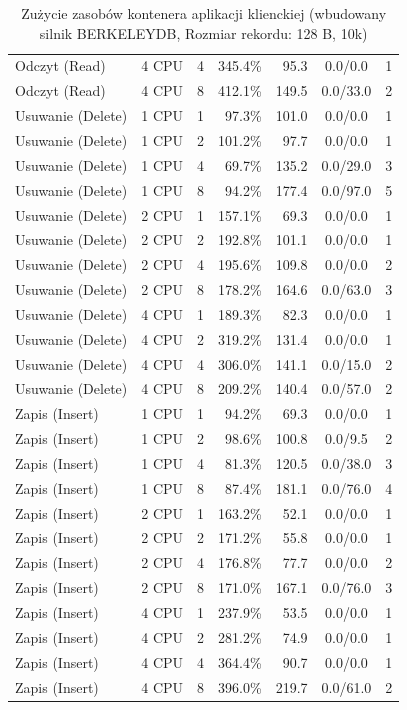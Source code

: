 \begin{table}[ht]
{\begin{tabular}{llcrrcc}
Odczyt (Read) & 4 CPU & 4 & 345.4\% & 95.3 & 0.0/0.0 & 1 \\
Odczyt (Read) & 4 CPU & 8 & 412.1\% & 149.5 & 0.0/33.0 & 2 \\
Usuwanie (Delete) & 1 CPU & 1 & 97.3\% & 101.0 & 0.0/0.0 & 1 \\
Usuwanie (Delete) & 1 CPU & 2 & 101.2\% & 97.7 & 0.0/0.0 & 1 \\
Usuwanie (Delete) & 1 CPU & 4 & 69.7\% & 135.2 & 0.0/29.0 & 3 \\
Usuwanie (Delete) & 1 CPU & 8 & 94.2\% & 177.4 & 0.0/97.0 & 5 \\
Usuwanie (Delete) & 2 CPU & 1 & 157.1\% & 69.3 & 0.0/0.0 & 1 \\
Usuwanie (Delete) & 2 CPU & 2 & 192.8\% & 101.1 & 0.0/0.0 & 1 \\
Usuwanie (Delete) & 2 CPU & 4 & 195.6\% & 109.8 & 0.0/0.0 & 2 \\
Usuwanie (Delete) & 2 CPU & 8 & 178.2\% & 164.6 & 0.0/63.0 & 3 \\
Usuwanie (Delete) & 4 CPU & 1 & 189.3\% & 82.3 & 0.0/0.0 & 1 \\
Usuwanie (Delete) & 4 CPU & 2 & 319.2\% & 131.4 & 0.0/0.0 & 1 \\
Usuwanie (Delete) & 4 CPU & 4 & 306.0\% & 141.1 & 0.0/15.0 & 2 \\
Usuwanie (Delete) & 4 CPU & 8 & 209.2\% & 140.4 & 0.0/57.0 & 2 \\
Zapis (Insert) & 1 CPU & 1 & 94.2\% & 69.3 & 0.0/0.0 & 1 \\
Zapis (Insert) & 1 CPU & 2 & 98.6\% & 100.8 & 0.0/9.5 & 2 \\
Zapis (Insert) & 1 CPU & 4 & 81.3\% & 120.5 & 0.0/38.0 & 3 \\
Zapis (Insert) & 1 CPU & 8 & 87.4\% & 181.1 & 0.0/76.0 & 4 \\
Zapis (Insert) & 2 CPU & 1 & 163.2\% & 52.1 & 0.0/0.0 & 1 \\
Zapis (Insert) & 2 CPU & 2 & 171.2\% & 55.8 & 0.0/0.0 & 1 \\
Zapis (Insert) & 2 CPU & 4 & 176.8\% & 77.7 & 0.0/0.0 & 2 \\
Zapis (Insert) & 2 CPU & 8 & 171.0\% & 167.1 & 0.0/76.0 & 3 \\
Zapis (Insert) & 4 CPU & 1 & 237.9\% & 53.5 & 0.0/0.0 & 1 \\
Zapis (Insert) & 4 CPU & 2 & 281.2\% & 74.9 & 0.0/0.0 & 1 \\
Zapis (Insert) & 4 CPU & 4 & 364.4\% & 90.7 & 0.0/0.0 & 1 \\
Zapis (Insert) & 4 CPU & 8 & 396.0\% & 219.7 & 0.0/61.0 & 2 \\
\bottomrule
\end{tabular}%
}
\caption{Zużycie zasobów kontenera aplikacji klienckiej (wbudowany silnik BERKELEYDB, Rozmiar rekordu: 128 B, 10k)}
\label{tab:resources_berkeleydb_small_10000}
\end{table}
